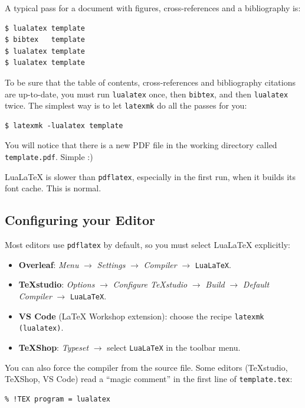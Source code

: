 A typical pass for a document with figures, cross-references and a bibliography is:
\begin{verbatim}
$ lualatex template
$ bibtex   template
$ lualatex template
$ lualatex template
\end{verbatim}

To be sure that the table of contents, cross-references and bibliography citations are up-to-date, you must run \verb|lualatex| once, then \verb|bibtex|, and then \verb|lualatex| twice. The simplest way is to let \verb|latexmk| do all the passes for you:
\begin{verbatim}
$ latexmk -lualatex template
\end{verbatim}
You will notice that there is a new PDF file in the working directory called \verb|template.pdf|. Simple :)

LuaLaTeX is slower than \verb|pdflatex|, especially in the first run, when it builds its font cache. This is normal.

\subsection{Configuring your Editor} %
\label{ssec:configuring_your_editor}

Most editors use \verb|pdflatex| by default, so you must select LuaLaTeX explicitly:
\begin{itemize}
	\item \textbf{Overleaf}: \emph{Menu} $\rightarrow$ \emph{Settings} $\rightarrow$ \emph{Compiler} $\rightarrow$ \texttt{LuaLaTeX}.
	\item \textbf{TeXstudio}: \emph{Options} $\rightarrow$ \emph{Configure TeXstudio} $\rightarrow$ \emph{Build} $\rightarrow$ \emph{Default Compiler} $\rightarrow$ \texttt{LuaLaTeX}.
	\item \textbf{VS Code} (LaTeX Workshop extension): choose the recipe \texttt{latexmk (lualatex)}.
	\item \textbf{TeXShop}: \emph{Typeset} $\rightarrow$ select \texttt{LuaLaTeX} in the toolbar menu.
\end{itemize}

You can also force the compiler from the source file. Some editors (TeXstudio, TeXShop, VS Code) read a ``magic comment'' in the first line of \texttt{template.tex}:
\begin{verbatim}
% !TEX program = lualatex
\end{verbatim}

